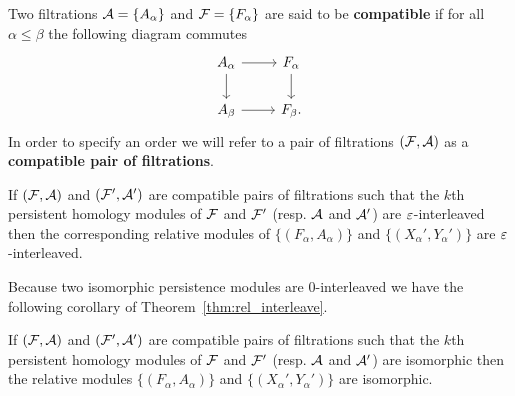 \begin{definition}
  Two filtrations $\mathcal{A} = \{A_\alpha\}$ and $\mathcal{F} = \{F_\alpha\}$ are said to be \textbf{compatible} if for all $\alpha\leq\beta$ the following diagram commutes
  \begin{equation}\label{dgm:compatible}
    \begin{tikzcd}
      A_\alpha\arrow{r}\arrow{d} &
      F_\alpha\arrow{d}\\
      A_\beta\arrow{r} &
      F_\beta.
    \end{tikzcd}
  \end{equation}
  In order to specify an order we will refer to a pair of filtrations $(\mathcal{F}, \mathcal{A})$ as a \textbf{compatible pair of filtrations}.
\end{definition}

\begin{theorem}\label{thm:rel_interleave}
  If $(\mathcal{F}, \mathcal{A})$ and $(\mathcal{F}', \mathcal{A}')$ are compatible pairs of filtrations such that the $k$th persistent homology modules of $\mathcal{F}$ and $\mathcal{F}'$ (resp. $\mathcal{A}$ and $\mathcal{A}'$) are $\varepsilon$-interleaved then the corresponding relative modules of $\{(F_\alpha, A_\alpha)\}$ and $\{(X_\alpha', Y_\alpha')\}$ are $\varepsilon$-interleaved.
\end{theorem}

Because two isomorphic persistence modules are $0$-interleaved we have the following corollary of Theorem~\ref{thm:rel_interleave}.

\begin{corollary}\label{cor:rel_interleave_iso}
  If $(\mathcal{F}, \mathcal{A})$ and $(\mathcal{F}', \mathcal{A}')$ are compatible pairs of filtrations such that the $k$th persistent homology modules of $\mathcal{F}$ and $\mathcal{F}'$ (resp. $\mathcal{A}$ and $\mathcal{A}'$) are isomorphic then the relative modules $\{(F_\alpha, A_\alpha)\}$ and $\{(X_\alpha', Y_\alpha')\}$ are isomorphic.
\end{corollary}

